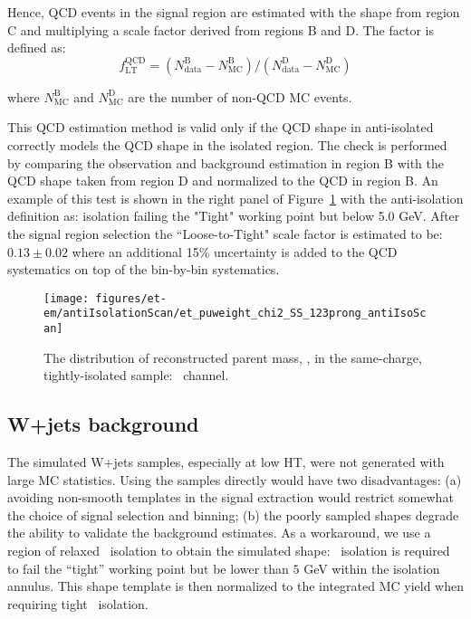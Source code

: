Hence, QCD events in the signal region are estimated with the shape from region C 
and multiplying a scale factor derived from regions B and D. The factor is defined as:
\begin{equation}\label{eq:et_qcd_sf}
f_\mathrm{LT}^\mathrm{QCD} = \left(N_\mathrm{data}^\mathrm{B} - N_\mathrm{MC}^\mathrm{B}\right)
/ \left(N_\mathrm{data}^\mathrm{D} -
N_\mathrm{MC}^\mathrm{D}\right)
\end{equation}

\noindent where $N_\mathrm{MC}^\mathrm{B}$ and $N_\mathrm{MC}^\mathrm{D}$ are the number of non-QCD MC events.

This QCD estimation method is valid only if the QCD shape in
anti-isolated correctly models the QCD shape in the isolated
region. The check is performed by comparing the observation and background
estimation in region B with the QCD shape taken from region D and
normalized to the QCD in region B.  An example of this test is shown
in the right panel of Figure~\ref{fig:et_sst} with the anti-isolation
definition as: \tauh isolation failing the "Tight" working point but
below 5.0 GeV. After the signal region selection the ``Loose-to-Tight" scale factor is estimated
to be: $0.13 \pm 0.02$ where an additional 15\% uncertainty is added to the QCD systematics 
on top of the bin-by-bin systematics.

\begin{figure}[thbp!]\centering
  \texttt{[image: figures/et-em/antiIsolationScan/et\_puweight\_chi2\_SS\_123prong\_antiIsoScan]} %
  \caption{\label{fig:et_sst} The distribution of reconstructed parent
    mass, \meffetau, in the same-charge, tightly-isolated sample:
    \teth ~channel.}
\end{figure}

\subsection{W+jets background}
\label{sec:et_w_bkg_validation}

The simulated W+jets samples, especially at low HT, were not
generated with large MC statistics.  Using the samples directly would
have two disadvantages: (a) avoiding non-smooth templates in the
signal extraction would restrict somewhat the choice of signal
selection and binning; (b) the poorly sampled shapes degrade the
ability to validate the background estimates.  As a workaround, we use
a region of relaxed \tauh ~isolation to obtain the simulated shape:
\tauh ~isolation is required to fail the ``tight'' working point but be
lower than $5$ GeV within the isolation annulus.  This shape template is then normalized to the
integrated MC yield when requiring tight \tauh ~isolation.

